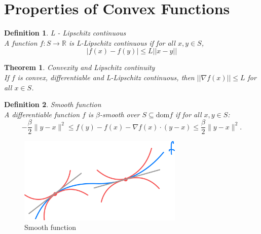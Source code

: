 \documentclass[11pt]{book} %
\newtheorem{theorem}{Theorem}[section]
\newtheorem{definition}{Definition}[section]
\begin{document}


\section{Properties of Convex Functions}

\begin{definition}{L - Lipschitz continuous} \\
A function $f: S \rightarrow \mathbb{R}$ is L-Lipschitz continuous if for all $x, y \in S$,
\begin{equation}
    |f(x) - f(y)| \leq L ||x-y||
\end{equation}    
\end{definition}

\begin{theorem}{Convexity and Lipschitz continuity} \\
If $f$ is convex, differentiable and L-Lipschitz continuous, then $||\nabla f(x)|| \leq L$ for all $x \in S$. 
\end{theorem}

\begin{definition} {Smooth function} \\
    A differentiable function \( f \) is \(\beta\)-smooth over \( S \subseteq \text{dom} f \) if for all \( x, y \in S \):
    \[-\frac{\beta}{2} \|y - x\|^2 \leq f(y) - f(x) - \nabla f(x) \cdot (y - x) \leq \frac{\beta}{2} \|y - x\|^2.\]
\end{definition}


\begin{figure}[H]
    \centering
    \includegraphics[width=0.7\textwidth]{Figs/beta_smooth_function.png}
    \caption{Smooth function}
\end{figure}
\end{document}
